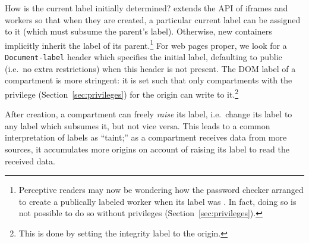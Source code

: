 %

How is the current label initially determined?
%
\sys{} extends the API of iframes and workers so that when they are
created, a particular current label can be assigned to it (which
must subsume the parent's label).  Otherwise, new containers implicitly
inherit the label of its parent.\footnote{Perceptive readers may now be wondering how
the password checker arranged to create a publically labeled worker
when its label was .  In fact, doing so is not possible
to do so without privileges (Section~\ref{sec:privileges}).}
%
For web pages proper, we look for a {\tt Document-label} header which
specifies the initial label, defaulting to public (i.e.\ no extra
restrictions) when this header is not present.
%
The DOM label of a compartment is more stringent: it is set such that
only compartments with the privilege (Section~\ref{sec:privileges}) for the origin can write to
it.\footnote{This is done by setting the integrity label to the origin.}

After creation, a compartment can freely \emph{raise} its label, i.e.\
change its label to any label which subsumes it, but not vice versa.
%
This leads to a common interpretation of labels as ``taint;'' as
a compartment receives data from more sources, it accumulates more
origins on account of raising its label to read the received data.


